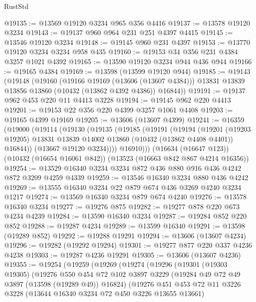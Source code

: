\begin{lexlean}{RustStd}
\begin{coremodule}
@19135 := @13569 @19120 @3234 @965 @356 @4416
@19137 := @13578 @19120 @3234
@19143 := @19137 @960 @964 @231 @251 @4397 @4415
@19145 := @13546 @19120 @3234
@19148 := @19145 @960 @231 @4397
@19153 := @13770 @19120 @3234 @3234 @958 @435
@19160 := @19153 @34 @356 @231 @4384 @3257 @1021 @4392
@19165 := @13590 @19120 @3234 @944 @436 @944
@19166 := @19165 @4384
@19169 := @13598 (@13599 @19120 @944)
@19185 := @19143
    (@19148
      (@19160
        (@19166 @19169 (@13606 (@13607 @4384)))
        @13831
        @13839
        @13856
        @13860
        (@10432 (@13862 @4392 @4386))
        @16844))
@19191 := @19137 @962 @453 @220 @11 @4413 @3228
@19194 := @19145 @962 @220 @4413
@19201 := @19153 @22 @356 @220 @4399 @3257 @1061 @4408
@19203 := @19165 @4399 @19169
@19205 := @13606 (@13607 @4399)
@19241 := @16359
    (@19000
      (@19114
        (@19130
          (@19135
            (@19185
              (@19191
                (@19194
                  (@19201
                    (@19203 @19205)
                    @13831
                    @13839
                    @14002
                    @13860
                    (@10432 (@13862 @4408 @4401))
                    @16844))
                (@13667 @19120 @3234))))
          @16910)))
    (@16634 (@16647 @123))
    (@10432 (@16654 @16061 @842))
    (@13523 (@16663 @842 @867 @4214 @16356))
@19254 := @13529 @16340 @3234 @3234 @872 @436 @880 @916 @436 @4242 @872 @3209 @4259 @4339
@19259 := @13546 @16340 @3234 @880 @436 @4242
@19269 := @13555 @16340 @3234 @22 @879 @674 @436 @3269 @4240 @3234 @1217
@19274 := @13569 @16340 @3234 @879 @674 @4240
@19276 := @13578 @16340 @3234
@19277 := @19276 @875
@19282 := @19277 @878 @220 @673 @4234 @4239
@19284 := @13590 @16340 @3234
@19287 := @19284 @852 @220 @852
@19288 := @19287 @4234
@19289 := @13599 @16340
@19291 := @13598 (@19289 @852)
@19292 := @19288 @19291
@19294 := @13606 (@13607 @4234)
@19296 := @19282 (@19292 @19294)
@19301 := @19277 @877 @220 @337 @4236 @4238
@19303 := @19287 @4236 @19291
@19305 := @13606 (@13607 @4236)
@19355 := @19254
    (@19259
      (@19269
        (@19274
          (@19296
            (@19301
              (@19303 @19305)
              (@19276
                @550
                @454
                @72
                @102
                @3897
                @3229
                (@19284 @49 @72 @49 @3897 (@13598 (@19289 @49)) @16824)
                (@19276
                  @451
                  @453
                  @72
                  @11
                  @3226
                  @3228
                  (@13644 @16340 @3234 @72 @450 @3226 @13655 @13661)

\end{coremodule}
\end{lexlean}
